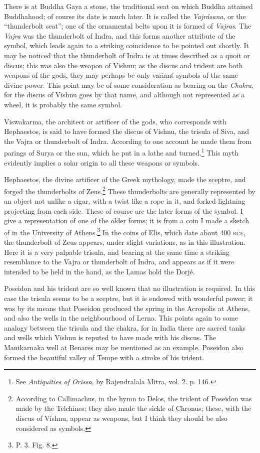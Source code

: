 \documentclass[a4paper, 11pt, oneside, english]{article}
\begin{document}
There is at Buddha Gaya a stone, the traditional seat on which Buddha attained Buddhahood; of course its date is much later. It is called the \emph{Vajrásana}, or the ``thunderbolt seat''; one of the ornamental belts upon it is formed of \emph{Vajras}. The \emph{Vajra} was the thunderbolt of Indra, and this forms another attribute of the symbol, which leads again to a striking coincidence to be pointed out shortly. It may be noticed that the thunderbolt of Indra is at times described as a quoit or discus; this was also the weapon of Vishnu; as the discus and trident are both weapons of the gods, they may perhaps be only variant symbols of the same divine power. This point may be of some consideration as bearing on the \emph{Chakra}, for the discus of Vishnu goes by that name, and although not represented as a wheel, it is probably the same symbol.

Viswakarma, the architect or artificer of the gods, who corresponds with Hephaestos, is said to have formed the discus of Vishnu, the trisula of Siva, and the Vajra or thunderbolt of Indra. According to one account he made them from parings of Surya or the sun, which he put in a lathe and turned.\footnote{See \emph{Antiquities of Orissa}, by Rajendralala Mitra, vol. 2. p. 146.} This myth evidently implies a solar origin to all these weapons or symbols.

Hephaestos, the divine artificer of the Greek mythology, made the sceptre, and forged the thunderbolts of Zeus.\footnote{According to Callimachus, in the hymn to Delos, the trident of Poseidon was made by the Telchines; they also made the sickle of Chronus; these, with the discus of Vishnu, appear as weapons, but I think they should be also considered as symbols.} These thunderbolts are generally represented by an object not unlike a cigar, with a twist like a rope in it, and forked lightning projecting from each side. These of course are the later forms of the symbol. I give a representation of one of the older forms; it is from a coin I made a sketch of in the University of Athens.\footnote{P. 3. Fig. 8.} In the coins of Elis, which date about 400 \textsc{bce}, the thunderbolt of Zeus appears, under slight variations, as in this illustration. Here it is a very palpable trisula, and bearing at the same time a striking resemblance to the Vajra or thunderbolt of Indra, and appears as if it were intended to be held in the hand, as the Lamas hold the Dorjé.

Poseidon and his trident are so well known that no illustration is required. In this case the trisula seems to be a sceptre, but it is endowed with wonderful power; it was by its means that Poseidon produced the spring in the Acropolis at Athens, and also the wells in the neighbourhood of Lerna. This points again to some analogy between the trisula and the chakra, for in India there are sacred tanks and wells which Vishnu is reputed to have made with his discus. The Manikarnaka well at Benares may be mentioned as an example. Poseidon also formed the beautiful valley of Tempe with a stroke of his trident.
\end{document}
